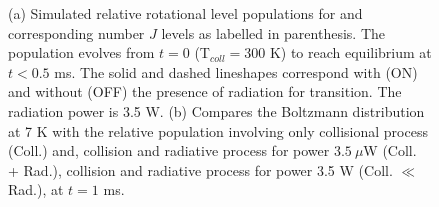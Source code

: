 \begin{figure}[!htb]
    \hfill
    
    \caption{(a) Simulated relative rotational level populations for \CD and corresponding number $J$ levels as labelled in parenthesis. The population evolves from $t=0$ (T$_{coll}=300$ K) to reach equilibrium at $t<0.5$ ms. The solid and dashed lineshapes correspond with (ON) and without (OFF) the presence of radiation for \CD \CDline transition. The radiation power is 3.5 W. (b) Compares the Boltzmann distribution at 7 K with the relative population involving only collisional process (Coll.) and, collision and radiative process for power $3.5\ \mu$W (Coll. + Rad.), collision and radiative process for power 3.5 W (Coll. $\ll$ Rad.), at $t=1$ ms.}
    \label{fig:ROSAA-sim-coll-rad-population-boltzmann-higher-rad}
\end{figure}